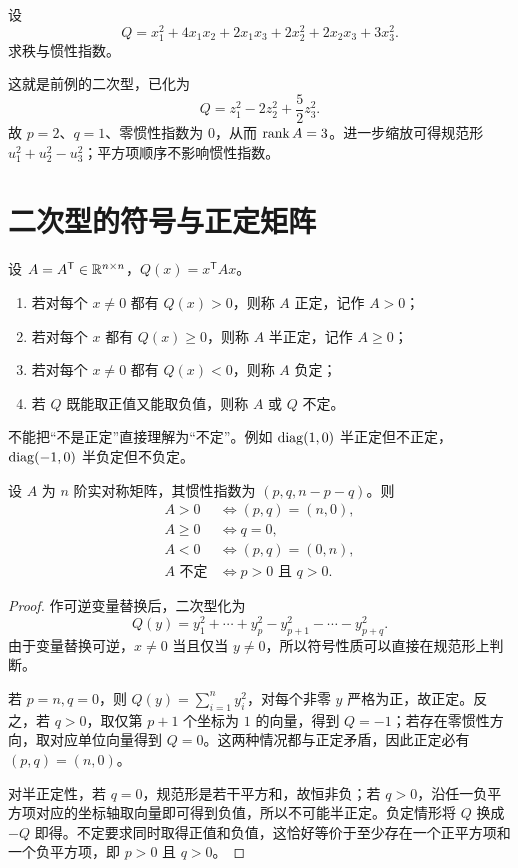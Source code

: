 \begin{example}[title={利用配方法求惯性指数}]
设
\[
Q=x_1^2+4x_1x_2+2x_1x_3+2x_2^2+2x_2x_3+3x_3^2.
\]
求秩与惯性指数。
\begin{solution}
这就是前例的二次型，已化为
\[
Q=z_1^2-2z_2^2+\frac52z_3^2.
\]
故 $p=2$、$q=1$、零惯性指数为 $0$，从而 $\operatorname{rank} A=3$。进一步缩放可得规范形 $u_1^2+u_2^2-u_3^2$；平方项顺序不影响惯性指数。
\end{solution}
\end{example}

\section{二次型的符号与正定矩阵}

\begin{definition}
设 $A=A^{\mathsf T}\in\mathbb{R}^{n\times n}$，$Q(x)=x^{\mathsf T}Ax$。
\begin{enumerate}
\item 若对每个 $x\ne0$ 都有 $Q(x)>0$，则称 $A$ 正定，记作 $A>0$；
\item 若对每个 $x$ 都有 $Q(x)\ge0$，则称 $A$ 半正定，记作 $A\ge0$；
\item 若对每个 $x\ne0$ 都有 $Q(x)<0$，则称 $A$ 负定；
\item 若 $Q$ 既能取正值又能取负值，则称 $A$ 或 $Q$ 不定。
\end{enumerate}
\end{definition}

不能把“不是正定”直接理解为“不定”。例如 $\operatorname{diag}(1,0)$ 半正定但不正定，$\operatorname{diag}(-1,0)$ 半负定但不负定。

\begin{theorem}[惯性指数判据]
设 $A$ 为 $n$ 阶实对称矩阵，其惯性指数为 $(p,q,n-p-q)$。则
\begin{align*}
A>0 &\iff (p,q)=(n,0),\\
A\ge0 &\iff q=0,\\
A<0 &\iff (p,q)=(0,n),\\
A\text{ 不定} &\iff p>0\text{ 且 }q>0.
\end{align*}
\end{theorem}
\begin{proof}
作可逆变量替换后，二次型化为
\[
Q(y)=y_1^2+\cdots+y_p^2-y_{p+1}^2-\cdots-y_{p+q}^2.
\]
由于变量替换可逆，$x\ne0$ 当且仅当 $y\ne0$，所以符号性质可以直接在规范形上判断。

若 $p=n,q=0$，则 $Q(y)=\sum_{i=1}^n y_i^2$，对每个非零 $y$ 严格为正，故正定。反之，若 $q>0$，取仅第 $p+1$ 个坐标为 $1$ 的向量，得到 $Q=-1$；若存在零惯性方向，取对应单位向量得到 $Q=0$。这两种情况都与正定矛盾，因此正定必有 $(p,q)=(n,0)$。

对半正定性，若 $q=0$，规范形是若干平方和，故恒非负；若 $q>0$，沿任一负平方项对应的坐标轴取向量即可得到负值，所以不可能半正定。负定情形将 $Q$ 换成 $-Q$ 即得。不定要求同时取得正值和负值，这恰好等价于至少存在一个正平方项和一个负平方项，即 $p>0$ 且 $q>0$。
\end{proof}

